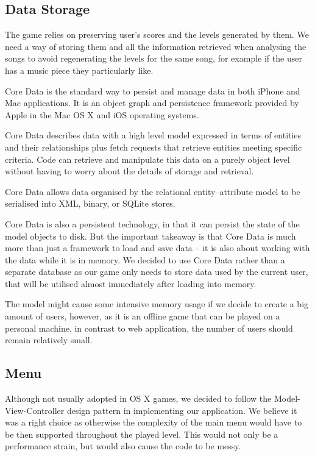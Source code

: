 \vspace{10pt}


\subsection{Data Storage}

The game relies on preserving user's scores and the levels generated by them. We need a way of storing them and all the information retrieved when analysing the songs to avoid regenerating the levels for the same song, for example if the user has a music piece they particularly like.

Core Data is the standard way to persist and manage data in both iPhone and Mac applications. It is an object graph and persistence framework provided by Apple in the Mac OS X and iOS operating systems. 

Core Data describes data with a high level model expressed in terms of entities and their relationships plus fetch requests that retrieve entities meeting specific criteria. Code can retrieve and manipulate this data on a purely object level without having to worry about the details of storage and retrieval. 

Core Data allows data organised by the relational entity–attribute model to be serialised into XML, binary, or SQLite stores.

Core Data is also a persistent technology, in that it can persist the state of the model objects to disk. But the important takeaway is that Core Data is much more than just a framework to load and save data -- it is also about working with the data while it is in memory.
We decided to use Core Data rather than a separate database as our game only needs to store data used by the current user, that will be utilised almost immediately after loading into memory. 
  
The model might cause some intensive memory usage if we decide to create a big amount of users, however, as it is an offline game that can be played on a personal machine, in contrast to web application, the number of users should remain relatively small.

\vspace{10pt}

\subsection{Menu}

Although not usually adopted in OS X games, we decided to follow the Model-View-Controller design pattern in implementing our application. We believe it was a right choice as otherwise the complexity of the main menu would have to be then supported throughout the played level. This would not only be a performance strain, but would also cause the code to be messy.


